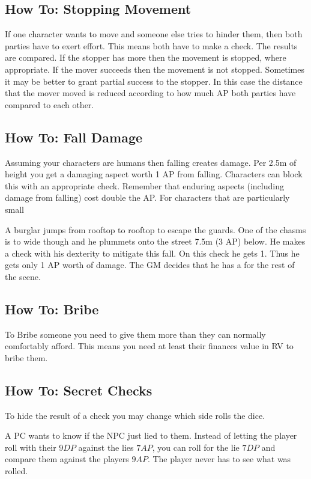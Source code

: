 \documentclass[11pt]{article}
\begin{document}
{\subsection{How To: Stopping Movement}
\label{sec:org3920791}
If one character wants to move and someone else tries to hinder them, then both parties have to exert effort. This means both have to make a check. The results are compared. If the stopper has more then the movement is stopped, where appropriate. If the mover succeeds then the movement is not stopped. Sometimes it may be better to grant partial success to the stopper. In this case the distance that the mover moved is reduced according to how much AP both parties have compared to each other.
\subsection{How To: Fall Damage}
\label{sec:orgf73c1fd}
Assuming your characters are humans then falling creates damage. Per 2.5m of height you get a damaging aspect worth 1 AP from falling. Characters can block this with an appropriate check. Remember that enduring aspects (including damage from falling) cost double the AP.
For characters that are particularly small

\begin{pwexample}
A burglar jumps from rooftop to rooftop to escape the guards. One of the chasms is to wide though and he plummets onto the street 7.5m (3 AP) below. He makes a check with his dexterity to mitigate this fall. On this check he gets 1. Thus he gets only 1 AP worth of damage. The GM decides that he has a  for the rest of the scene.
\end{pwexample}
\subsection{How To: Bribe}
\label{sec:orgaa21b7a}
To Bribe someone you need to give them more than they can normally comfortably afford. This means you need at least their finances value in RV to bribe them.
\subsection{How To: Secret Checks}
\label{sec:orgb756fee}
To hide the result of a check you may change which side rolls the dice.

\begin{pwexample}
A PC wants to know if the NPC just lied to them. Instead of letting the player roll with their \(9 DP\) against the lies \(7 AP\), you can roll for the lie \(7 DP\) and compare them against the players \(9 AP\). The player never has to see what was rolled.
\end{pwexample}
}
\end{document}
